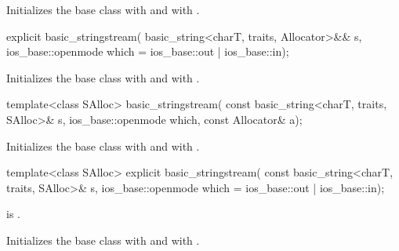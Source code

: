 \begin{itemdescr}
\pnum
\effects
Initializes the base class with
and  with
.
\end{itemdescr}

%
\begin{itemdecl}
explicit basic_stringstream(
  basic_string<charT, traits, Allocator>&& s,
  ios_base::openmode which = ios_base::out | ios_base::in);
\end{itemdecl}

\begin{itemdescr}
\pnum
\effects
Initializes the base class with
and  with
.
\end{itemdescr}

%
\begin{itemdecl}
template<class SAlloc>
  basic_stringstream(
    const basic_string<charT, traits, SAlloc>& s,
    ios_base::openmode which, const Allocator& a);
\end{itemdecl}

\begin{itemdescr}
\pnum
\effects
Initializes the base class with
and  with
.
\end{itemdescr}

%
\begin{itemdecl}
template<class SAlloc>
  explicit basic_stringstream(
    const basic_string<charT, traits, SAlloc>& s,
    ios_base::openmode which = ios_base::out | ios_base::in);
\end{itemdecl}

\begin{itemdescr}
\pnum
\constraints
{} is .

\pnum
\effects
Initializes the base class with
and  with
.
\end{itemdescr}

